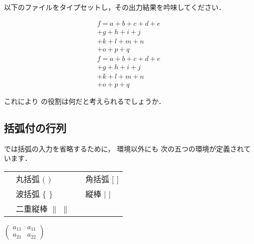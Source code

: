 \begin{Prob}
以下のファイルをタイプセットし，その出力結果を吟味してください．

\begin{InTeX}
\setlength\multlinegap{10pt}
\begin{multline}
 f = a + b + c + d + e \\
   + g + h + i + j \\
   + k + l + m + n \\
   + o + p + q 
\end{multline} 
\setlength\multlinegap{30pt}
\begin{multline}
 f = a + b + c + d + e \\
   + g + h + i + j \\
   + k + l + m + n \\
   + o + p + q 
\end{multline}
\end{InTeX} 

これにより の役割は何だと考えられるでしょうか．
\end{Prob}

\InOutRulefalse

\subsection{括弧付の行列}

\AmSLaTeX では括弧の入力を省略するために， 環境以外にも
次の五つの環境が定義されています．
\begin{Syntax}
\begin{tabular}{llll}
 \E{pmatrix} &{丸括弧   $($  \va{行列要素} $)$ } & 
 \E{bmatrix} &{角括弧   $[$  \va{行列要素} $]$ } \\
 \E{Bmatrix} &{波括弧   $\{$ \va{行列要素} $\}$} & 
 \E{vmatrix} &{縦棒     $|$  \va{行列要素} $|$ } \\
 \E{Vmatrix} &{二重縦棒 $\|$ \va{行列要素} $\|$} & & \\
\end{tabular}
\end{Syntax}

\begin{InOut}
 \begin{math}
  \begin{pmatrix}
   a_{11} & a_{11} \\
   a_{21} & a_{22} 
  \end{pmatrix}
 \end{math}
\end{InOut}

